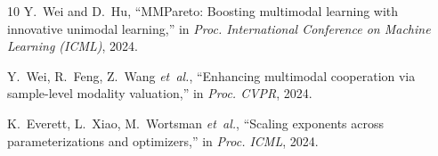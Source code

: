 \documentclass[conference]{IEEEtran}
\begin{document}
\begin{thebibliography}{10}
Y.~Wei and D.~Hu, ``{MMPareto}: Boosting multimodal learning with innovative unimodal learning,'' in \emph{Proc. International Conference on Machine Learning (ICML)}, 2024.

Y.~Wei, R.~Feng, Z.~Wang \emph{et~al.}, ``Enhancing multimodal cooperation via sample-level modality valuation,'' in \emph{Proc. CVPR}, 2024.

K.~Everett, L.~Xiao, M.~Wortsman \emph{et~al.}, ``Scaling exponents across parameterizations and optimizers,'' in \emph{Proc. ICML}, 2024.

\end{thebibliography}
\end{document}
